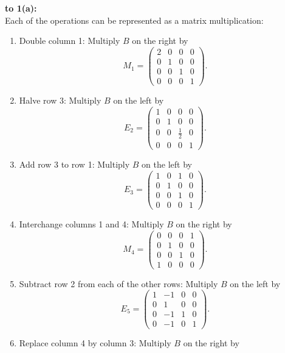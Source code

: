 \documentclass[lang=cn,11pt]{elegantbook}
\begin{document}
\begin{solution}
\textbf{to 1(a):}\\
Each of the operations can be represented as a matrix multiplication:
\begin{enumerate}
    \item Double column 1: Multiply \( B \) on the right by
    \[
    M_1 = 
    \begin{pmatrix}
    2 & 0 & 0 & 0 \\
    0 & 1 & 0 & 0 \\
    0 & 0 & 1 & 0 \\
    0 & 0 & 0 & 1
    \end{pmatrix}.
    \]
    \item Halve row 3: Multiply \( B \) on the left by
    \[
    E_2 = 
    \begin{pmatrix}
    1 & 0 & 0 & 0 \\
    0 & 1 & 0 & 0 \\
    0 & 0 & \frac{1}{2} & 0 \\
    0 & 0 & 0 & 1
    \end{pmatrix}.
    \]
    \item Add row 3 to row 1: Multiply \( B \) on the left by
    \[
    E_3 = 
    \begin{pmatrix}
    1 & 0 & 1 & 0 \\
    0 & 1 & 0 & 0 \\
    0 & 0 & 1 & 0 \\
    0 & 0 & 0 & 1
    \end{pmatrix}.
    \]
    \item Interchange columns 1 and 4: Multiply \( B \) on the right by
    \[
    M_4 = 
    \begin{pmatrix}
    0 & 0 & 0 & 1 \\
    0 & 1 & 0 & 0 \\
    0 & 0 & 1 & 0 \\
    1 & 0 & 0 & 0
    \end{pmatrix}.
    \]
    \item Subtract row 2 from each of the other rows: Multiply \( B \) on the left by
    \[
    E_5 = 
    \begin{pmatrix}
    1 & -1 & 0 & 0 \\
    0 & 1 & 0 & 0 \\
    0 & -1 & 1 & 0 \\
    0 & -1 & 0 & 1
    \end{pmatrix}.
    \]
    \item Replace column 4 by column 3: Multiply \( B \) on the right by

\end{enumerate}
\end{solution}
\end{document}
